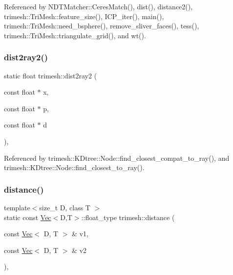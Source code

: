 Referenced by N\+D\+T\+Matcher\+::\+Ceres\+Match(), dist(), distance2(), trimesh\+::\+Tri\+Mesh\+::feature\+\_\+size(), I\+C\+P\+\_\+iter(), main(), trimesh\+::\+Tri\+Mesh\+::need\+\_\+bsphere(), remove\+\_\+sliver\+\_\+faces(), tess(), trimesh\+::\+Tri\+Mesh\+::triangulate\+\_\+grid(), and wt().

\mbox{\label{namespacetrimesh_a543a18089e2551b0f297e83a44f24c5c}} 
\subsubsection{\texorpdfstring{dist2ray2()}{dist2ray2()}}
{\footnotesize\ttfamily static float trimesh\+::dist2ray2 (\begin{DoxyParamCaption}\item[{const float $\ast$}]{x,  }\item[{const float $\ast$}]{p,  }\item[{const float $\ast$}]{d }\end{DoxyParamCaption})\hspace{0.3cm}{\ttfamily [inline]}, {\ttfamily [static]}}



Referenced by trimesh\+::\+K\+Dtree\+::\+Node\+::find\+\_\+closest\+\_\+compat\+\_\+to\+\_\+ray(), and trimesh\+::\+K\+Dtree\+::\+Node\+::find\+\_\+closest\+\_\+to\+\_\+ray().

\mbox{\label{namespacetrimesh_a164fd9300fcf43ae1fdb0ddcc84ea67d}} 
\subsubsection{\texorpdfstring{distance()}{distance()}}
{\footnotesize\ttfamily template$<$size\+\_\+t D, class T $>$ \\
static const \hyperlink{classtrimesh_1_1Vec}{Vec}$<$D,T$>$\+::float\+\_\+type trimesh\+::distance (\begin{DoxyParamCaption}\item[{const \hyperlink{classtrimesh_1_1Vec}{Vec}$<$ D, T $>$ \&}]{v1,  }\item[{const \hyperlink{classtrimesh_1_1Vec}{Vec}$<$ D, T $>$ \&}]{v2 }\end{DoxyParamCaption})\hspace{0.3cm}{\ttfamily [inline]}, {\ttfamily [static]}}

